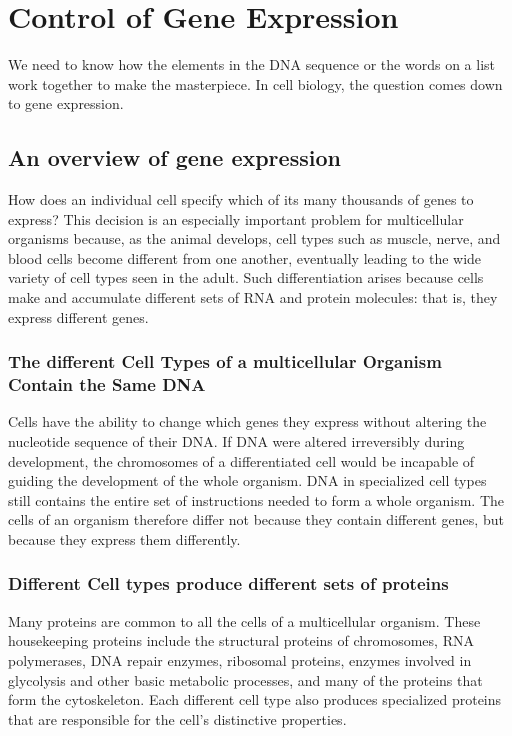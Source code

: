 \chapter{Control of Gene Expression}

We need to know how the elements in the DNA sequence or the words on a list work
together to make the masterpiece.
In cell biology, the question comes down to gene expression.

\section{An overview of gene expression}

How does an individual cell specify which of its many thousands of genes
to express? This decision is an especially important problem for multicellular
organisms because, as the animal develops, cell types such as
muscle, nerve, and blood cells become different from one another, eventually
leading to the wide variety of cell types seen in the adult. Such
differentiation arises because cells make and accumulate different sets
of RNA and protein molecules: that is, they express different genes.

\subsection{The different Cell Types of a multicellular Organism Contain the Same DNA}

Cells have the ability to change which genes they
express without altering the nucleotide sequence of their DNA.
If DNA were altered irreversibly during development,
the chromosomes of a differentiated cell would be incapable of guiding
the development of the whole organism. DNA in specialized cell types
still contains the entire set of instructions needed to form a whole organism.
The cells of an organism therefore differ not because they contain
different genes, but because they express them differently.

\subsection{Different Cell types produce different sets of proteins}

Many proteins are common to all the cells of a multicellular organism.
These housekeeping proteins include the structural
proteins of chromosomes, RNA polymerases, DNA repair enzymes, ribosomal
proteins, enzymes involved in glycolysis and other basic metabolic
processes, and many of the proteins that form the cytoskeleton. Each different
cell type also produces specialized proteins that are responsible for
the cell’s distinctive properties.

